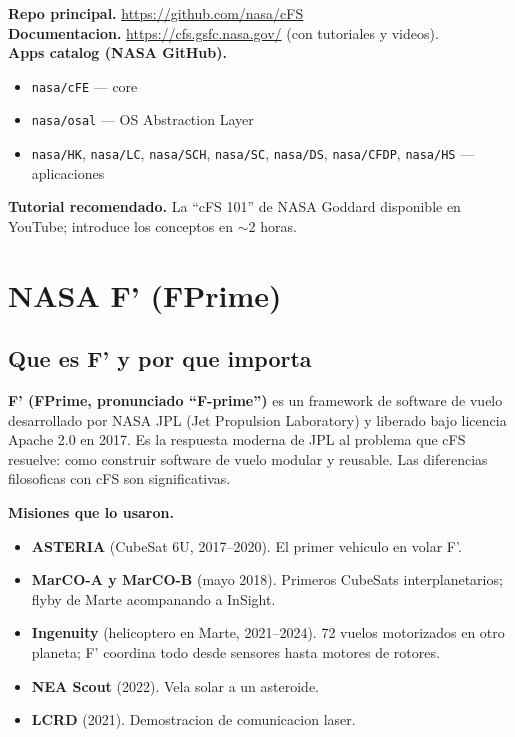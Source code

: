 \documentclass[11pt,a4paper,oneside,openright]{book}
\begin{document}
\begin{payloadbox}
\textbf{Repo principal.} \url{https://github.com/nasa/cFS}\\[0.3em]
\textbf{Documentacion.}
\url{https://cfs.gsfc.nasa.gov/} (con tutoriales y videos).\\[0.3em]
\textbf{Apps catalog (NASA GitHub).}
\begin{itemize}[leftmargin=2em]
  \item \texttt{nasa/cFE} --- core
  \item \texttt{nasa/osal} --- OS Abstraction Layer
  \item \texttt{nasa/HK}, \texttt{nasa/LC}, \texttt{nasa/SCH},
    \texttt{nasa/SC}, \texttt{nasa/DS}, \texttt{nasa/CFDP},
    \texttt{nasa/HS} --- aplicaciones
\end{itemize}
\textbf{Tutorial recomendado.} La ``cFS 101'' de NASA Goddard
disponible en YouTube; introduce los conceptos en $\sim$2 horas.
\end{payloadbox}

\chapter{NASA F' (FPrime)}

\section{Que es F' y por que importa}

\textbf{F' (FPrime, pronunciado ``F-prime'')} es un framework de
software de vuelo desarrollado por NASA JPL (Jet Propulsion
Laboratory) y liberado bajo licencia Apache 2.0 en 2017. Es la
respuesta moderna de JPL al problema que cFS resuelve: como construir
software de vuelo modular y reusable. Las diferencias filosoficas con
cFS son significativas.

\textbf{Misiones que lo usaron.}

\begin{itemize}[leftmargin=2em]
  \item \textbf{ASTERIA} (CubeSat 6U, 2017--2020). El primer
    vehiculo en volar F'.
  \item \textbf{MarCO-A y MarCO-B} (mayo 2018). Primeros CubeSats
    interplanetarios; flyby de Marte acompanando a InSight.
  \item \textbf{Ingenuity} (helicoptero en Marte, 2021--2024). 72
    vuelos motorizados en otro planeta; F' coordina todo desde
    sensores hasta motores de rotores.
  \item \textbf{NEA Scout} (2022). Vela solar a un asteroide.
  \item \textbf{LCRD} (2021). Demostracion de comunicacion laser.
\end{itemize}
\end{document}
